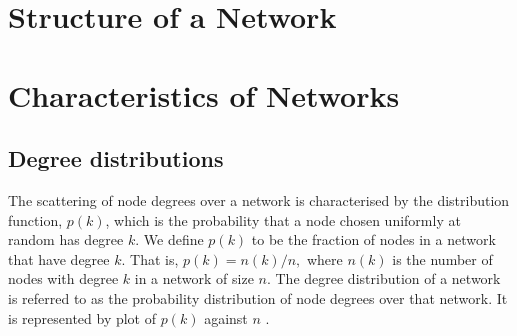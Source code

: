 \documentclass[10pt,a4paper]{article}
\begin{document}
\section{Structure of a Network}

\section{Characteristics of Networks}
\subsection{Degree distributions}
The scattering of node degrees over a network is characterised by the distribution function, $p(k)$, which is the probability that a node chosen uniformly at random has degree $k$. We define $p(k)$ to be the fraction of nodes in a network that have degree $k$. That is, $p(k) = n(k)/n,$ where $n(k)$ is the number of nodes with degree $k$ in a network of size $n$. The degree distribution of a network is  referred to as the probability distribution of node degrees over that network. It is represented by plot of $p(k)$ against $n$ \citep{estrada2011structure}. 
\end{document}
